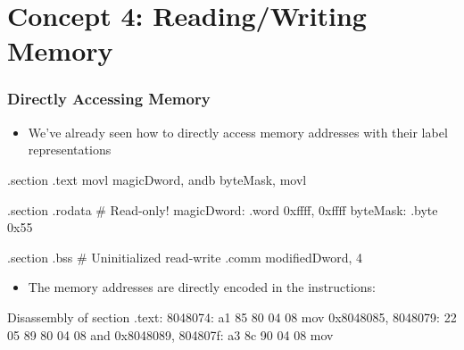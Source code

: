 \documentclass[11pt,xcolor=dvipsnames]{beamer}
\begin{document}
\section{Concept 4: Reading/Writing Memory}

\begin{frame}[fragile,t]
\frametitle{Directly Accessing Memory}
\begin{itemize}
  \item We've already seen how to directly access memory addresses with their label representations
\end{itemize}
\begin{gascode}
.section .text
movl magicDword, %
andb byteMask, %
movl %

.section .rodata          # Read-only!
magicDword: .word 0xffff, 0xffff
byteMask:   .byte 0x55

.section .bss             # Uninitialized read-write
.comm modifiedDword, 4
\end{gascode}
\begin{itemize}
  \item The memory addresses are directly encoded in the instructions:
\end{itemize}
\begin{customobjdumpcode}
Disassembly of section .text:
 8048074: a1 85 80 04 08        mov    0x8048085,%
 8048079: 22 05 89 80 04 08     and    0x8048089,%
 804807f: a3 8c 90 04 08        mov    %
\end{customobjdumpcode}
\end{frame}
\end{document}
